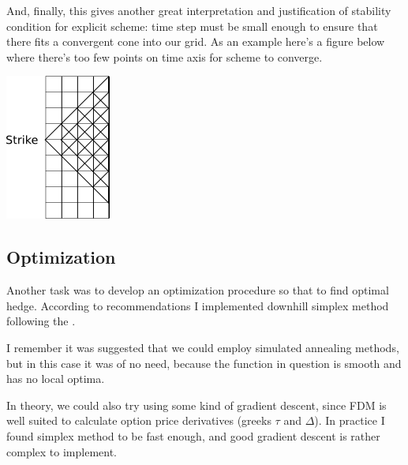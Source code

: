 \documentclass[11pt]{article} %
\begin{document}
And, finally, this gives another great interpretation and justification of stability condition for explicit scheme: time step must be small enough to ensure that there fits a convergent cone into our grid. As an example here's a figure below where there's too few points on time axis for scheme to converge.

\includegraphics[scale=0.5]{non-convergent-tree.png}\\

\subsection{Optimization}

Another task was to develop an optimization procedure so that to find optimal hedge. According to recommendations I implemented downhill simplex method following the \cite[\S 10.5]{JacksonStaunton02}. 

I remember it was suggested that we could employ simulated annealing methods, but in this case it was of no need, because the function in question is smooth and has no local optima.

In theory, we could also try using some kind of gradient descent, since FDM is well suited to calculate option price derivatives (greeks $\tau$ and $\Delta$). In practice I found simplex method to be fast enough, and good gradient descent is rather complex to implement.
\end{document}
